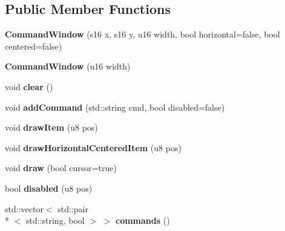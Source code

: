 \subsection*{Public Member Functions}
\begin{DoxyCompactItemize}
\item 
\hypertarget{classCommandWindow_a16ce84ea24577933cc9c2b5742858a8e}{{\bfseries Command\-Window} (s16 x, s16 y, u16 width, bool horizontal=false, bool centered=false)}\label{classCommandWindow_a16ce84ea24577933cc9c2b5742858a8e}

\item 
\hypertarget{classCommandWindow_a8dfa172ce7ba6d5b087538956acb6729}{{\bfseries Command\-Window} (u16 width)}\label{classCommandWindow_a8dfa172ce7ba6d5b087538956acb6729}

\item 
\hypertarget{classCommandWindow_a52c2d65f5ac6b625d2818cc04fd3c069}{void {\bfseries clear} ()}\label{classCommandWindow_a52c2d65f5ac6b625d2818cc04fd3c069}

\item 
\hypertarget{classCommandWindow_a25a8dd8239bb0f813b640ae9ade3df42}{void {\bfseries add\-Command} (std\-::string cmd, bool disabled=false)}\label{classCommandWindow_a25a8dd8239bb0f813b640ae9ade3df42}

\item 
\hypertarget{classCommandWindow_ac7010cc621b00bd8e6958f20e8b417a3}{void {\bfseries draw\-Item} (u8 pos)}\label{classCommandWindow_ac7010cc621b00bd8e6958f20e8b417a3}

\item 
\hypertarget{classCommandWindow_a08db648e18e771df8d3e0b1624605b31}{void {\bfseries draw\-Horizontal\-Centered\-Item} (u8 pos)}\label{classCommandWindow_a08db648e18e771df8d3e0b1624605b31}

\item 
\hypertarget{classCommandWindow_a8f7a85f2c08f749325b5989946971c27}{void {\bfseries draw} (bool cursor=true)}\label{classCommandWindow_a8f7a85f2c08f749325b5989946971c27}

\item 
\hypertarget{classCommandWindow_a280a15d609cf66878cc2d729517878e2}{bool {\bfseries disabled} (u8 pos)}\label{classCommandWindow_a280a15d609cf66878cc2d729517878e2}

\item 
\hypertarget{classCommandWindow_af2caf25e22f0113b49103a6a9001eb2d}{std\-::vector$<$ std\-::pair\\*
$<$ std\-::string, bool $>$ $>$ {\bfseries commands} ()}\label{classCommandWindow_af2caf25e22f0113b49103a6a9001eb2d}

\end{DoxyCompactItemize}
